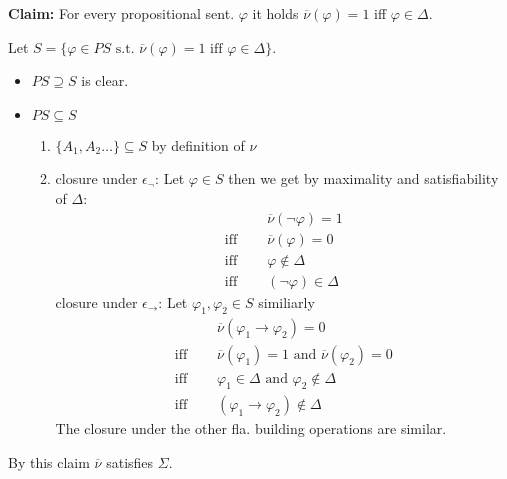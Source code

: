 {\begin{enumerate}
        \textbf{Claim:} For every propositional sent. $\varphi$ it holds $\overline{\nu}(\varphi) =1 $ iff $\varphi\in\Delta$.
        \begin{claimproof}
            Let $S = \{\varphi \in PS \text{ s.t. } \overline{\nu}(\varphi) = 1 \text{ iff } \varphi \in \Delta\}$. \\
            \begin{itemize}
                \item $PS\supseteq S$ is clear.
                \item $PS\subseteq S$ 
                \begin{enumerate}
                    \item $\{A_1,A_2\dots\}\subseteq S$ by definition of $\nu$
                    \item closure under $\epsilon_\lnot$: Let $\varphi\in S$ then we get by maximality and satisfiability of $\Delta$: 
                    \begin{equation*}
                        \begin{split}
                            &\overline{\nu}(\lnot\varphi) = 1\\
                            \text{iff }\quad&\overline{\nu}(\varphi) = 0\\
                            \text{iff }\quad& \varphi \notin \Delta\\
                            \text{iff }\quad& (\lnot \varphi)\in \Delta
                        \end{split}
                    \end{equation*}
                    closure under $\epsilon_\to$: Let $\varphi_1,\varphi_2\in S$ similiarly
                    \begin{equation*}
                        \begin{split}
                            &\overline{\nu}(\varphi_1\to \varphi_2) = 0\\
                            \text{iff }\quad&\overline{\nu}(\varphi_1) = 1 \text{ and } \overline{\nu}(\varphi_2) = 0\\
                            \text{iff }\quad& \varphi_1 \in \Delta \text{ and }\varphi_2 \notin \Delta\\
                            \text{iff }\quad& (\varphi_1\to \varphi_2)\notin \Delta 
                        \end{split}
                    \end{equation*}
                    The closure under the other fla. building operations are similar.\qedhere
                \end{enumerate}
            \end{itemize}
        \end{claimproof}
        By this claim $\overline{\nu}$ satisfies $\Sigma$.\qedhere
    \end{enumerate}
}

